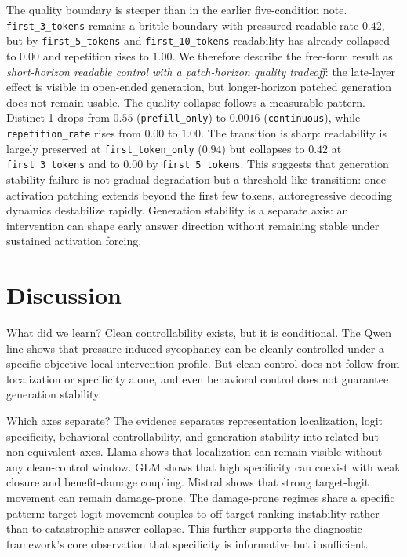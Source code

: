 \documentclass[11pt]{article}
\newcommand{\metric}[1]{\texttt{#1}}
\begin{document}
The quality boundary is steeper than in the earlier five-condition note.
\texttt{first\_3\_tokens} remains a brittle boundary with pressured readable rate \(0.42\), but by \texttt{first\_5\_tokens} and \texttt{first\_10\_tokens} readability has already collapsed to \(0.00\) and repetition rises to \(1.00\).
We therefore describe the free-form result as \emph{short-horizon readable control with a patch-horizon quality tradeoff}: the late-layer effect is visible in open-ended generation, but longer-horizon patched generation does not remain usable.
The quality collapse follows a measurable pattern.
Distinct-1 drops from \(0.55\) (\texttt{prefill\_only}) to \(0.0016\) (\texttt{continuous}), while \metric{repetition\_rate} rises from \(0.00\) to \(1.00\).
The transition is sharp: readability is largely preserved at \texttt{first\_token\_only} (\(0.94\)) but collapses to \(0.42\) at \texttt{first\_3\_tokens} and to \(0.00\) by \texttt{first\_5\_tokens}.
This suggests that generation stability failure is not gradual degradation but a threshold-like transition: once activation patching extends beyond the first few tokens, autoregressive decoding dynamics destabilize rapidly.
Generation stability is a separate axis: an intervention can shape early answer direction without remaining stable under sustained activation forcing.

\section{Discussion}

What did we learn?
Clean controllability exists, but it is conditional.
The Qwen line shows that pressure-induced sycophancy can be cleanly controlled under a specific objective-local intervention profile.
But clean control does not follow from localization or specificity alone, and even behavioral control does not guarantee generation stability.

Which axes separate?
The evidence separates representation localization, logit specificity, behavioral controllability, and generation stability into related but non-equivalent axes.
Llama shows that localization can remain visible without any clean-control window.
GLM shows that high specificity can coexist with weak closure and benefit-damage coupling.
Mistral shows that strong target-logit movement can remain damage-prone.
The damage-prone regimes share a specific pattern: target-logit movement couples to off-target ranking instability rather than to catastrophic answer collapse.
This further supports the diagnostic framework's core observation that specificity is informative but insufficient.
\end{document}
